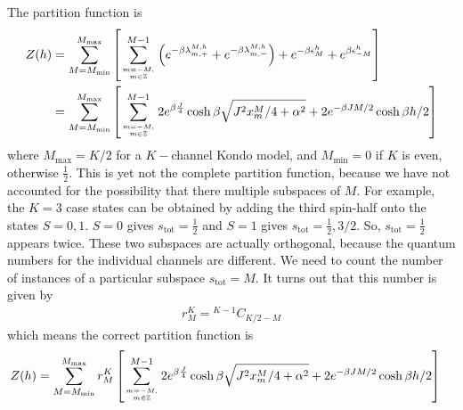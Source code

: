 \documentclass[12pt]{revtex4-2}
\begin{document}
The partition function is
\begin{align}
	Z(h) &= \sum_{M=M_\text{min}}^{M_\text{max}}\left[\sum_{m=-M, \atop{m\in \mathbb{Z}}}^{M-1}\left(e^{-\beta \lambda_{m, +}^{M, h}} + e^{-\beta \lambda_{m, -}^{M, h}}\right) + e^{-\beta \epsilon^h_{M}} + e^{\beta \epsilon^h_{- M}}\right] \\
	&=\sum_{M=M_\text{min}}^{M_\text{max}}\left[\sum_{m=-M, \atop{m\in \mathbb{Z}}}^{M-1}2e^{\beta \frac{J}{4}}\cosh \beta\sqrt{J^2x^M_m/4 + \alpha^2} + 2e^{-\beta JM/2}\cosh \beta h/2\right]
\end{align}
where \(M_\text{max} = K/2\) for a \(K-\)channel Kondo model, and \(M_\text{min} = 0\)  if \(K\) is even, otherwise \(\frac{1}{2}\). This is yet not the complete partition function, because we have not accounted for the possibility that there multiple subspaces of \(M\). For example, the \(K=3\) case states can be obtained by adding the third spin-half onto the states \(S=0,1\). \(S=0\) gives \(s_\text{tot}=\frac{1}{2}\) and \(S=1\) gives \(s_\text{tot} = \frac{1}{2}, 3/2\). So, \(s_\text{tot} = \frac{1}{2}\) appears twice. These two subspaces are actually orthogonal, because the quantum numbers for the individual channels are different. We need to count the number of instances of a particular subspace \(s_\text{tot}=M\). It turns out that this number is given by
\begin{align}
	\label{extra_degen}
	r^K_M = {}^{K-1}C_{K/2 - M}
\end{align}
which means the correct partition function is
\begin{align}
	Z(h) &=\sum_{M=M_\text{min}}^{M_\text{max}}r^K_M\left[\sum_{m=-M, \atop{m\in \mathbb{Z}}}^{M-1}2e^{\beta \frac{J}{4}}\cosh \beta\sqrt{J^2x^M_m/4 + \alpha^2} + 2e^{-\beta JM/2}\cosh \beta h/2\right]
\end{align}
\end{document}
